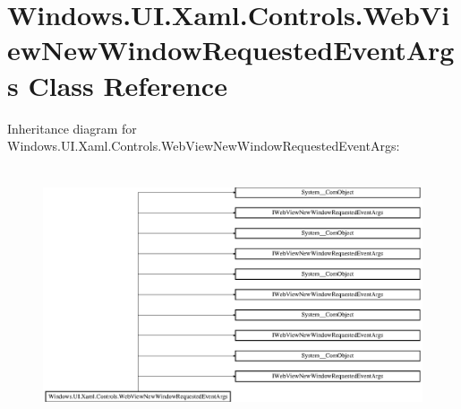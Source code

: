 \hypertarget{class_windows_1_1_u_i_1_1_xaml_1_1_controls_1_1_web_view_new_window_requested_event_args}{}\section{Windows.\+U\+I.\+Xaml.\+Controls.\+Web\+View\+New\+Window\+Requested\+Event\+Args Class Reference}
\label{class_windows_1_1_u_i_1_1_xaml_1_1_controls_1_1_web_view_new_window_requested_event_args}
Inheritance diagram for Windows.\+U\+I.\+Xaml.\+Controls.\+Web\+View\+New\+Window\+Requested\+Event\+Args\+:\begin{figure}[H]
\begin{center}
\leavevmode
\includegraphics[height=7.493917cm]{class_windows_1_1_u_i_1_1_xaml_1_1_controls_1_1_web_view_new_window_requested_event_args}
\end{center}
\end{figure}
